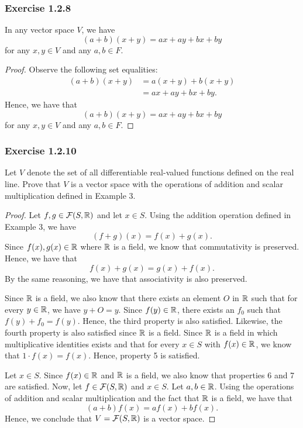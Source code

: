 \subsubsection{Exercise 1.2.8}
In any vector space \( V  \), we have 
\[  (a+b)(x+y) = ax + ay + bx + by  \] for any \( x ,y \in V  \) and any \( a,b \in F  \).
\begin{proof}
Observe the following set equalities:
\begin{align*}
    (a+b)(x+y) &= a(x+y) + b(x+y) \tag{VS 8} \\
               &= ax + ay + bx + by \tag{VS 7}.
\end{align*}
Hence, we have that 
\[  (a+b)(x+y) = ax + ay + bx + by  \] for any \( x ,y \in V  \) and any \( a,b \in F  \).
\end{proof}



\subsubsection{Exercise 1.2.10} Let \( V  \) denote the set of all differentiable real-valued functions defined on the real line. Prove that \( V  \) is a vector space with the operations of addition and scalar multiplication defined in Example 3.  
\begin{proof}
    Let \( f,g \in \mathcal{F }(S,\mathbb{R} ) \) and let \( x \in S  \). Using the addition operation defined in Example 3, we have  
    \[  (f+g)(x) = f(x) + g(x). \]
    Since \( f(x) , g(x) \in \mathbb{R}  \) where \( \mathbb{R}  \) is a field, we know that commutativity is preserved. Hence, we have that 
    \[  f(x) + g(x) = g(x) + f(x). \]
    By the same reasoning, we have that associativity is also preserved.

 Since \( \mathbb{R}  \) is a field, we also know that there exists an element \( O  \) in \( \mathbb{R}  \) such that for every \( y \in \mathbb{R}  \), we have \( y + O = y  \). Since \( f(y) \in \mathbb{R}  \), there exists an  \(f_{0}   \) such that   \( f(y) + f_{0} = f(y)  \). Hence, the third property is also satisfied. Likewise, the fourth property is also satisfied since \( \mathbb{R}  \) is a field.
Since \( \mathbb{R}  \) is a field in which multiplicative identities exists and that for every \( x \in S  \) with \( f(x) \in \mathbb{R}  \), we know that \( 1 \cdot f(x) = f(x)  \). Hence, property 5 is satisfied.

 Let \( x \in S  \). Since \( f(x) \in \mathbb{R}  \) and \( \mathbb{R}  \) is a field, we also know that properties 6 and 7 are satisfied. Now, let \( f \in \mathcal{F}(S, \mathbb{R} ) \) and \( x \in S  \). Let \( a,b \in \mathbb{R}  \). Using the operations of addition and scalar multiplication and the fact that \( \mathbb{R}  \) is a field, we have that 
 \[ (a+b)f(x) = a f(x) + b f(x).\]
 Hence, we conclude that \( V = \mathcal{F}(S, \mathbb{R} ) \) is a vector space.

\end{proof}



